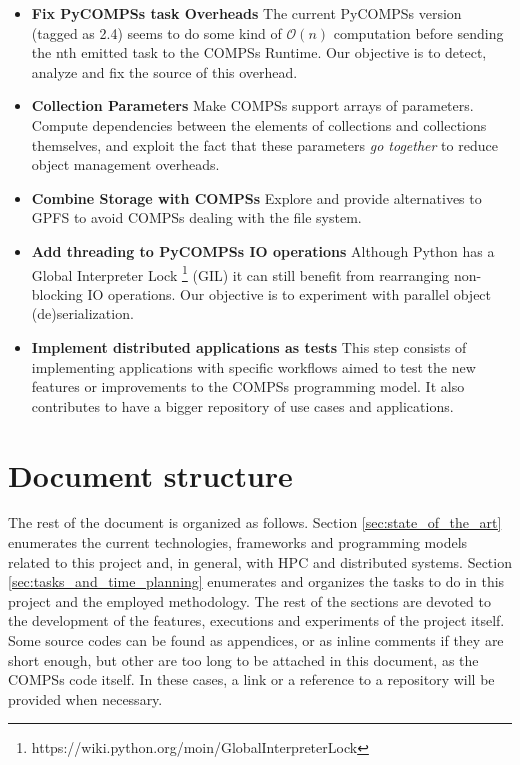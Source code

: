 \begin{itemize}
\item \textbf{Fix PyCOMPSs task Overheads} The current PyCOMPSs version (tagged as 2.4) seems to do some kind of $\mathcal{O}(n)$ computation before sending the nth emitted task to the COMPSs Runtime. Our objective is to detect, analyze and fix the source of this overhead.
\item \textbf{Collection Parameters} Make COMPSs support arrays of parameters. Compute dependencies between the elements of collections and collections themselves, and exploit the fact that these parameters \textit{go together} to reduce object management overheads.
\item \textbf{Combine Storage with COMPSs} Explore and provide alternatives to GPFS to avoid COMPSs dealing with the file system. 
\item \textbf{Add threading to PyCOMPSs IO operations} Although Python has a Global Interpreter Lock \footnote{https://wiki.python.org/moin/GlobalInterpreterLock} (GIL) it can still benefit from rearranging non-blocking IO operations. Our objective is to experiment with parallel object (de)serialization.
\item \textbf{Implement distributed applications as tests} This step consists of implementing applications with specific workflows aimed to test the new features or improvements to the COMPSs programming model. It also contributes to have a bigger repository of use cases and applications.
\end{itemize}


\section{Document structure}
\label{subsec:document_structure}
The rest of the document is organized as follows. Section \ref{sec:state_of_the_art} enumerates the current technologies, frameworks and programming models related to this project and, in general, with HPC and distributed systems. Section \ref{sec:tasks_and_time_planning} enumerates and organizes the tasks to do in this project and the employed methodology. The rest of the sections are devoted to the development of the features, executions and experiments of the project itself. Some source codes can be found as appendices, or as inline comments if they are short enough, but other are too long to be attached in this document, as the COMPSs code itself. In these cases, a link or a reference to a repository will be provided when necessary.